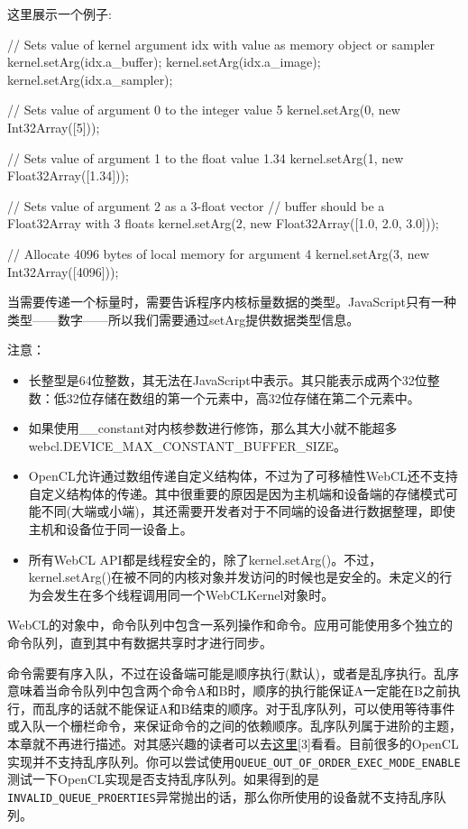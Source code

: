 这里展示一个例子:

\begin{codebox}[javascript]
// Sets value of kernel argument idx with value as memory object or sampler
kernel.setArg(idx.a_buffer);
kernel.setArg(idx.a_image);
kernel.setArg(idx.a_sampler);

// Sets value of argument 0 to the integer value 5
kernel.setArg(0, new Int32Array([5]));

// Sets value of argument 1 to the float value 1.34
kernel.setArg(1, new Float32Array([1.34]));

// Sets value of argument 2 as a 3-float vector
// buffer should be  a Float32Array with 3 floats
kernel.setArg(2, new Float32Array([1.0, 2.0, 3.0]));

// Allocate 4096 bytes of local memory for argument 4
kernel.setArg(3, new Int32Array([4096]));
\end{codebox}

当需要传递一个标量时，需要告诉程序内核标量数据的类型。JavaScript只有一种类型——数字——所以我们需要通过setArg提供数据类型信息。

注意：

\begin{itemize}
\item 长整型是64位整数，其无法在JavaScript中表示。其只能表示成两个32位整数：低32位存储在数组的第一个元素中，高32位存储在第二个元素中。
\item 如果使用\_\allowbreak{}\_\allowbreak{}constant对内核参数进行修饰，那么其大小就不能超多webcl.DEVICE\_\allowbreak{}MAX\_\allowbreak{}CONSTANT\_\allowbreak{}BUFFER\_\allowbreak{}SIZE。
\item OpenCL允许通过数组传递自定义结构体，不过为了可移植性WebCL还不支持自定义结构体的传递。其中很重要的原因是因为主机端和设备端的存储模式可能不同(大端或小端)，其还需要开发者对于不同端的设备进行数据整理，即使主机和设备位于同一设备上。
\item 所有WebCL API都是线程安全的，除了kernel.setArg()。不过，kernel.setArg()在被不同的内核对象并发访问的时候也是安全的。未定义的行为会发生在多个线程调用同一个WebCLKernel对象时。
\end{itemize}

WebCL的对象中，命令队列中包含一系列操作和命令。应用可能使用多个独立的命令队列，直到其中有数据共享时才进行同步。

命令需要有序入队，不过在设备端可能是顺序执行(默认)，或者是乱序执行。乱序意味着当命令队列中包含两个命令A和B时，顺序的执行能保证A一定能在B之前执行，而乱序的话就不能保证A和B结束的顺序。对于乱序队列，可以使用等待事件或入队一个栅栏命令，来保证命令的之间的依赖顺序。乱序队列属于进阶的主题，本章就不再进行描述。对其感兴趣的读者可以去\href{http://sa09.ida.ucdavis.edu/docs/SA09-opencl-dg-events-stream.pdf}{这里}[3]看看。目前很多的OpenCL实现并不支持乱序队列。你可以尝试使用\texttt{QUEUE\_OUT\_OF\_ORDER\_EXEC\_MODE\_ENABLE}测试一下OpenCL实现是否支持乱序队列。如果得到的是\texttt{INVALID\_QUEUE\_PROERTIES}异常抛出的话，那么你所使用的设备就不支持乱序队列。

